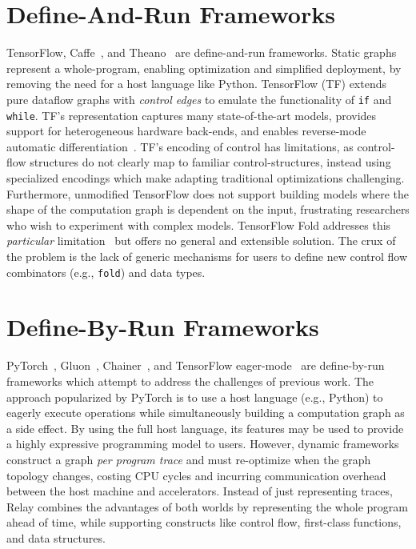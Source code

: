 \section{Define-And-Run Frameworks}

TensorFlow, Caffe~\citep{caffe}, and Theano~\citep{theano} are define-and-run frameworks.
Static graphs represent a whole-program,
  enabling optimization and simplified deployment,
  by removing the need for a host language like Python.
TensorFlow (TF) extends pure dataflow graphs with \textit{control edges}
      to emulate the functionality of \verb|if| and \verb|while|.
TF's representation captures many state-of-the-art models,
      provides support for heterogeneous hardware back-ends,
      and enables reverse-mode automatic differentiation~{\citep{ad_survey, tensorflow}}.
TF's encoding of control has limitations, as control-flow structures
    do not clearly map to familiar control-structures, instead using specialized
    encodings which make adapting traditional optimizations challenging.
Furthermore,
    unmodified TensorFlow does not support building models where the shape of
    the computation graph is dependent on the input,
    frustrating researchers who wish to experiment with complex models.
TensorFlow Fold addresses this \textit{particular} limitation~\citep{tensorflowfold}
    but offers no general and extensible solution.
The crux of the problem is the lack of generic mechanisms for users to
    define new control flow combinators (e.g., \verb|fold|) and data types.

\section{Define-By-Run Frameworks}
PyTorch~\citep{pytorch_ad}, Gluon~\citep{gluon}, Chainer~\citep{chainer_learningsys2015},
    and TensorFlow eager-mode~\citep{tf_eager} are define-by-run frameworks which
    attempt to address the challenges of previous work.
The approach popularized by PyTorch is to use a host language (e.g., Python)
    to eagerly execute operations while simultaneously building a computation graph
    as a side effect.
By using the full host language,
  its features may be used to provide a highly expressive programming model to users.
However, dynamic frameworks construct a graph \textit{per program trace} and must re-optimize when
    the graph topology changes, costing CPU cycles and incurring communication overhead between the host
    machine and accelerators.
Instead of just representing traces, Relay combines the advantages of both worlds by
    representing the whole program ahead of time,
    while supporting constructs like control flow, first-class functions, and data structures.


